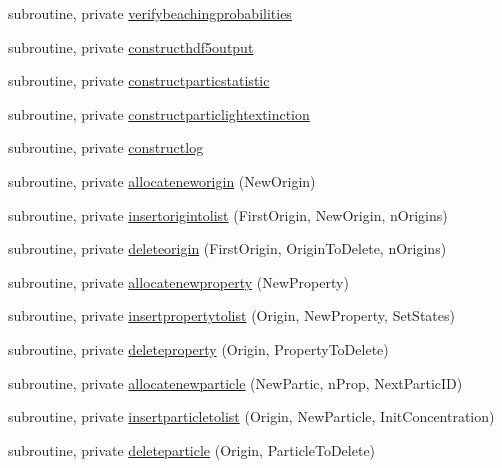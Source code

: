 \begin{DoxyCompactItemize}
subroutine, private \mbox{\hyperlink{namespacemodulelagrangian_a73aa2ae55efd7276fcb02ec56c40eba3}{verifybeachingprobabilities}}
\item 
subroutine, private \mbox{\hyperlink{namespacemodulelagrangian_a95739a2a3f7752220aa5fe865d07c62b}{constructhdf5output}}
\item 
subroutine, private \mbox{\hyperlink{namespacemodulelagrangian_a9111f92be66d257fc573bf898bbc38d9}{constructparticstatistic}}
\item 
subroutine, private \mbox{\hyperlink{namespacemodulelagrangian_a30983416b73c9972c63df2c25371661d}{constructparticlightextinction}}
\item 
subroutine, private \mbox{\hyperlink{namespacemodulelagrangian_a6dace26d0d9efdc26334c8afd5ae9220}{constructlog}}
\item 
subroutine, private \mbox{\hyperlink{namespacemodulelagrangian_a28216eb4bc7ae29253535daa2e07a0ae}{allocateneworigin}} (New\+Origin)
\item 
subroutine, private \mbox{\hyperlink{namespacemodulelagrangian_a842c38bc1af98cfe321b3cd2eca5aa14}{insertorigintolist}} (First\+Origin, New\+Origin, n\+Origins)
\item 
subroutine, private \mbox{\hyperlink{namespacemodulelagrangian_a29d4dbfc02fe16a5c49ac6fac8d3e427}{deleteorigin}} (First\+Origin, Origin\+To\+Delete, n\+Origins)
\item 
subroutine, private \mbox{\hyperlink{namespacemodulelagrangian_a85933ed7a699fa0b842b3a0c17c94bbb}{allocatenewproperty}} (New\+Property)
\item 
subroutine, private \mbox{\hyperlink{namespacemodulelagrangian_ad3e2ea0ce974a102fea039aef69c4626}{insertpropertytolist}} (Origin, New\+Property, Set\+States)
\item 
subroutine, private \mbox{\hyperlink{namespacemodulelagrangian_abff255f913afc4b6a6e6434a97f541f9}{deleteproperty}} (Origin, Property\+To\+Delete)
\item 
subroutine, private \mbox{\hyperlink{namespacemodulelagrangian_aaf265958f7abd87e754e7ff44745bdf0}{allocatenewparticle}} (New\+Partic, n\+Prop, Next\+Partic\+ID)
\item 
subroutine, private \mbox{\hyperlink{namespacemodulelagrangian_a96b3fbaf01697148bac38553d6198dc3}{insertparticletolist}} (Origin, New\+Particle, Init\+Concentration)
\item 
subroutine, private \mbox{\hyperlink{namespacemodulelagrangian_a0acccf68f63b061b6ad6122ccbe76ac1}{deleteparticle}} (Origin, Particle\+To\+Delete)
\item 

\end{DoxyCompactItemize}
